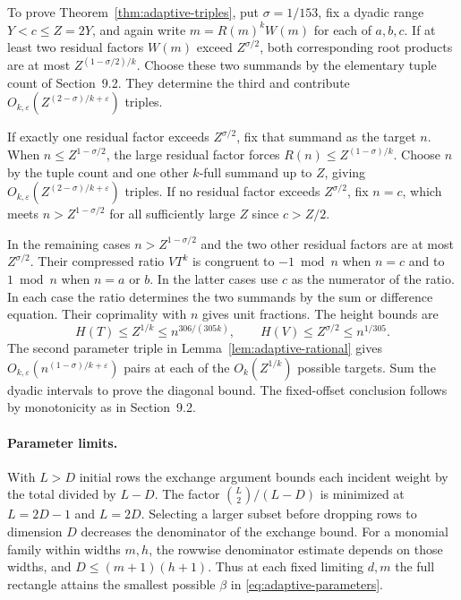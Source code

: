 \documentclass[11pt,reqno]{amsart}
\newcommand{\eps}{\varepsilon}
\begin{document}
To prove Theorem~\ref{thm:adaptive-triples}, put
\(\sigma=1/153\), fix a dyadic range \(Y<c\le Z=2Y\),
and again write \(m=R(m)^kW(m)\) for each of \(a,b,c\).
If at least two residual factors \(W(m)\) exceed
\(Z^{\sigma/2}\), both corresponding root products are
at most \(Z^{(1-\sigma/2)/k}\).
Choose these two summands by the elementary tuple count
of Section~9.2. They determine the third and contribute
\(O_{k,\eps}(Z^{(2-\sigma)/k+\eps})\) triples.

If exactly one residual factor exceeds \(Z^{\sigma/2}\),
fix that summand as the target \(n\).
When \(n\le Z^{1-\sigma/2}\), the large residual factor
forces \(R(n)\le Z^{(1-\sigma)/k}\).
Choose \(n\) by the tuple count and one other \(k\)-full
summand up to \(Z\), giving
\(O_{k,\eps}(Z^{(2-\sigma)/k+\eps})\) triples.
If no residual factor exceeds \(Z^{\sigma/2}\), fix
\(n=c\), which meets \(n>Z^{1-\sigma/2}\) for all
sufficiently large \(Z\) since \(c>Z/2\).

In the remaining cases \(n>Z^{1-\sigma/2}\) and the two
other residual factors are at most \(Z^{\sigma/2}\).
Their compressed ratio \(VT^k\) is congruent to \(-1\bmod n\)
when \(n=c\) and to \(1\bmod n\) when \(n=a\) or \(b\).
In the latter cases use \(c\) as the numerator of the
ratio. In each case the ratio determines the two summands
by the sum or difference equation. Their coprimality with
\(n\) gives unit fractions. The height bounds are
\[
 H(T)\le Z^{1/k}\le n^{306/(305k)},\qquad
 H(V)\le Z^{\sigma/2}\le n^{1/305}.
\]
The second parameter triple in Lemma~\ref{lem:adaptive-rational}
gives \(O_{k,\eps}(n^{(1-\sigma)/k+\eps})\) pairs at each
of the \(O_k(Z^{1/k})\) possible targets.
Sum the dyadic intervals to prove the diagonal bound.
The fixed-offset conclusion follows by monotonicity as
in Section~9.2.

\paragraph{Parameter limits.}
With \(L>D\) initial rows the exchange argument bounds each
incident weight by the total divided by \(L-D\).
The factor \(\binom L2/(L-D)\) is minimized at \(L=2D-1\)
and \(L=2D\). Selecting a larger subset before dropping
rows to dimension \(D\) decreases the denominator of the
exchange bound. For a monomial family within widths \(m,h\),
the rowwise denominator estimate depends on those widths,
and \(D\le(m+1)(h+1)\). Thus at each fixed limiting \(d,m\)
the full rectangle attains the smallest possible \(\beta\)
in \eqref{eq:adaptive-parameters}.
\end{document}
